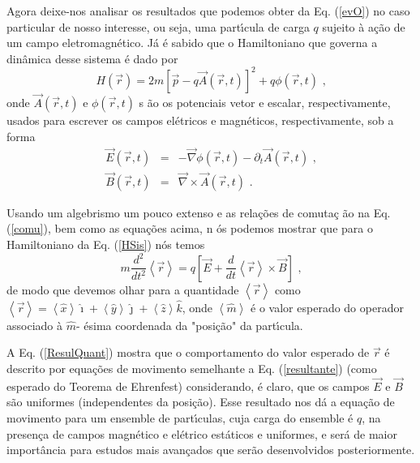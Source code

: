 \documentclass[twocolumn]{rbef}
\newcommand{\1}{\mathbbm{1}}
\begin{document}
Agora deixe-nos analisar os resultados que podemos obter da
Eq. (\ref{evO}) no caso particular de nosso interesse, ou seja, uma
part\'{\i}cula de carga $q$ sujeito à ação de um campo
eletromagn\'{e}tico. Já é sabido que o Hamiltoniano que governa a
dinâmica desse sistema é dado por \cite{Sakuray:book}
\begin{equation}
  H\left( \vec{r}\right) =2m\left[ \vec{p}-q\vec{A}\left( \vec{r},t\right) %
  \right] ^{2}+q\phi \left( \vec{r},t\right) \text{ ,}  \label{HSis}
\end{equation}%
onde $\vec{A}\left( \vec{r},t\right) $ e $\phi \left( \vec{r},t\right) $
s%
\~{a}o os potenciais vetor e escalar, respectivamente, usados para
escrever os campos el\'{e}tricos e magn\'{e}ticos, respectivamente, sob
a forma%
\begin{eqnarray}
  \vec{E}\left( \vec{r},t\right)  &=&-\vec{\nabla}\phi \left( \vec{r},t\right)
                                      -\partial _{t}\vec{A}\left( \vec{r},t\right) \text{ ,}  \label{E} \\
  \vec{B}\left( \vec{r},t\right)  &=&\vec{\nabla}\times \vec{A}\left( \vec{r}%
                                      ,t\right)  \text{ .} \label{B}
\end{eqnarray}

Usando um algebrismo um pouco extenso e as rela\c{c}\~{o}es de
comuta\c{c}%
\~{a}o na Eq. (\ref{comu}), bem como as equa\c{c}\~{o}es acima, n%
\'{o}s podemos mostrar que para o Hamiltoniano da Eq. (\ref{HSis})
n\'{o}s temos
\begin{equation}
  m\frac{d^{2}}{dt^{2}}\left\langle \vec{r}\right\rangle =q\left[ \vec{E}+%
    \frac{d}{dt}\left\langle \vec{r}\right\rangle \times \vec{B}\right] \text{ ,}
  \label{ResulQuant}
\end{equation}%
de modo que devemos olhar para a quantidade $\left\langle \vec{r}%
\right\rangle $ como
$\left\langle \vec{r}\right\rangle =\left\langle \hat{x}%
\right\rangle \hat{\imath}+\left\langle \hat{y}\right\rangle
\hat{\jmath}%
+\left\langle \hat{z}\right\rangle \hat{k}$, onde $\left\langle \hat{m}%
\right\rangle $ \'{e} o valor esperado do operador associado \`{a}
$\hat{m}$-%
\'{e}sima coordenada da "posi\c{c}\~{a}o" da part\'{\i}cula.

A Eq. (\ref{ResulQuant}) mostra que o comportamento do valor esperado de
$\vec{r}$ é descrito por equações de movimento semelhante a
Eq. (\ref{resultante}) (como esperado do Teorema de Ehrenfest)
considerando, é claro, que os campos $\vec{E}$ e $\vec{B}$ s\~{a}o
uniformes (independentes da posi\c{c}\~{a}o). Esse resultado nos d\'{a}
a equa\c{c}\~{a}o de movimento para um ensemble de part\'{\i}culas, cuja
carga do ensemble \'{e} $q$, na presen\c{c}a de campos magn\'{e}tico e
el\'{e}trico est\'{a}ticos e uniformes, e será de maior import\^{a}ncia
para estudos mais avançados que serão desenvolvidos posteriormente.
\end{document}
